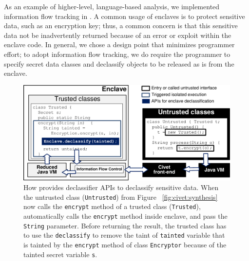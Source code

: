 As an example of higher-level, language-based analysis, we implemented information flow tracking
in \sysname{}.
A common usage of enclaves is to protect sensitive data, such as an encryption key;
thus, a common concern is that this sensitive data not be inadvertently returned because of an error or exploit within the enclave code.
In general, we chose a design point that minimizes programmer effort; to adopt information flow tracking, we
do require the programmer to specify secret data classes and declassify objects to be released as is from the enclave.

\begin{figure}[t!]
\centering
\includegraphics[width=5.2in]{civet/figures/declassify.pdf}
\footnotesize
\caption[The \sysname{} declassifier APIs.]
{How \sysname{} provides declassifier APIs to declassify sensitive data.
When the untrusted class ({\tt Untrusted}) from Figure ~\ref{fig:civet:synthesis} now calls the {\tt encrypt} method of a trusted class ({\tt Trusted}),
\sysname{} automatically calls the {\tt encrypt} method inside enclave, and pass the {\tt String} parameter.
Before returning the result, the trusted class has to use the {\tt declassify} to remove the taint of {\tt tainted} variable that is tainted by the {\tt encrypt} method of class {\tt Encryptor} because of the tainted secret variable {\tt s}.
}
\label{fig:civet:declassify}
\end{figure}


